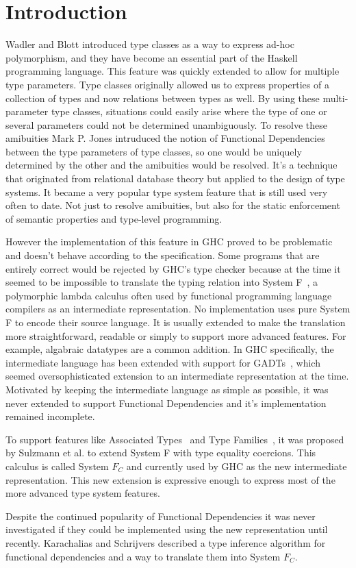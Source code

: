 \section{Introduction}
Wadler and Blott \cite{Wadler:1989:MAP:75277.75283} introduced type classes as a
way to express ad-hoc polymorphism, and they have become an essential part of the Haskell
programming language. This feature was quickly extended to allow for multiple
type parameters. Type classes originally allowed us to express properties of a
collection of types and now relations between types as well. By using
these multi-parameter type classes, situations could easily arise where the type
of one or several parameters could not be determined unambiguously. To resolve
these amibuities Mark P. Jones intruduced the notion of Functional Dependencies
\cite{Jones00typeclasses} between the type parameters of type classes, so one
would be uniquely determined by the other and the amibuities would be resolved.
It's a technique that originated from relational database theory but applied to
the design of type systems. It became a very popular type system feature that is
still used very often to date. Not just to resolve amibuities, but also for the
static enforcement of semantic properties and type-level programming.

However the implementation of this feature in GHC proved to be problematic and
doesn't behave according to the specification.  Some programs that are entirely
correct
would be rejected by GHC's type checker because at the time it seemed to be
impossible to translate the typing relation into System F~, a polymorphic
lambda calculus often used by functional programming language compilers as an
intermediate representation. No implementation uses pure System F to encode
their source language. It is usually extended to make the translation more
straightforward, readable or simply to support more advanced features. For
example, algabraic datatypes are a common addition. In GHC specifically, the intermediate language has been extended
with support for GADTs~, which seemed oversophisticated extension to an
intermediate representation at the time. Motivated by
keeping the intermediate language as simple as possible, it was never extended
to support Functional Dependencies and it's implementation remained incomplete.

To support features like Associated Types~ and Type Families~, it was proposed by
Sulzmann et al. \cite{Sulzmann:2007:SFT:1190315.1190324} to extend System F with
type equality coercions. This calculus is called System $F_C$ and currently used by
GHC as the new intermediate representation. This new extension is expressive
enough to express most of the more advanced type system features.

Despite the continued popularity of Functional Dependencies it was never
investigated if they could be implemented using the new representation until
recently. Karachalias and Schrijvers \cite{Karachalias:2017:EFD:3156695.3122966}
described a type inference algorithm for functional dependencies and a way to
translate them into System $F_C$.
